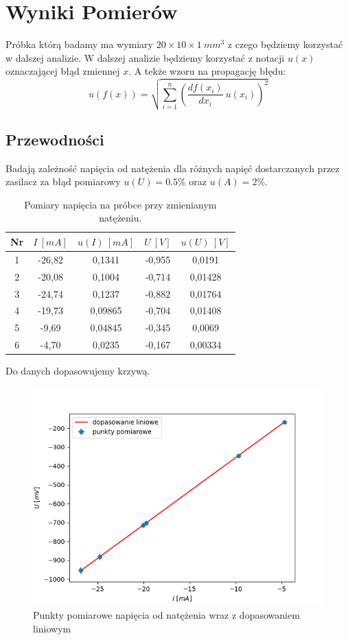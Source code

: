 \documentclass[12pt]{article}
\begin{document}
\section{Wyniki Pomierów}
Próbka którą badamy ma wymiary $20 \times 10 \times 1 \ mm^3$ z czego będziemy korzystać w dalszej analizie.
W dalszej analizie będziemy korzystać z notacji $u(x)$ oznaczającej błąd zmiennej $x$.
A tekże wzoru na propagację błędu:
\[
    u(f(x)) = \sqrt{\sum_{i=1}^{n} (\frac{df(x_i)}{dx_i} \ u(x_i))^2}
\]

\subsection{Przewodności}
Badają zależność napięcia od natężenia dla różnych napięć dostarczanych przez zasilacz za błąd pomiarowy\cite{multimeter_hand} $u(U) = 0.5\%$ oraz $u(A) = 2\%$. 
\begin{table}[h]
    \centering
    \begin{tabular}{c|cc|cc}
        \toprule
        Nr & $I \ [mA]$ & $u(I) \ [mA]$ & $U \ [V]$ & $u(U) \ [V]$ \\
        \midrule
        1 & -26{,}82 & 0{,}1341  & -0{,}955 & 0{,}0191  \\
        2 & -20{,}08 & 0{,}1004  & -0{,}714 & 0{,}01428 \\
        3 & -24{,}74 & 0{,}1237  & -0{,}882 & 0{,}01764 \\
        4 & -19{,}73 & 0{,}09865 & -0{,}704 & 0{,}01408 \\
        5 & -9{,}69  & 0{,}04845 & -0{,}345 & 0{,}0069  \\
        6 & -4{,}70  & 0{,}0235  & -0{,}167 & 0{,}00334 \\
        \bottomrule
    \end{tabular}
    \caption{Pomiary napięcia na próbce przy zmienianym natężeniu.}
    \label{tab:ohm_measurements}
\end{table}
Do danych dopasowujemy krzywą.
\begin{figure}[H]
    \centering
    \includegraphics[scale=0.5]{ohm_law}
    \caption{Punkty pomiarowe napięcia od natężenia wraz z dopasowaniem liniowym}
    \label{fig:ohm_measurments}
\end{figure}
\end{document}
